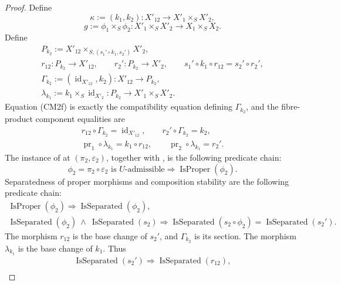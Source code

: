 \begin{proof}
  Define
  \[
    \kappa:=(k_1,k_2)\colon X'_{12}\to X'_1\times_SX'_2,
  \]
  \[
    g:=\phi_1\times_S\phi_2\colon
      X'_1\times_SX'_2\to X_1\times_SX_2.
  \]
  Define
  \[
  \begin{gathered}
    P_{k_2}:=X'_{12}\times_{S,(s_1'\circ k_1,s_2')}X'_2,\\
    r_{12}\colon P_{k_2}\to X'_{12},\qquad
    r_2'\colon P_{k_2}\to X'_2,\qquad
    s_1'\circ k_1\circ r_{12}=s_2'\circ r_2',\\
    \Gamma_{k_2}:=(\operatorname{id}_{X'_{12}},k_2)
      \colon X'_{12}\to P_{k_2},\\
    \lambda_{k_1}:=k_1\times_S\operatorname{id}_{X'_2}
      \colon P_{k_2}\to X'_1\times_SX'_2.                       
  \end{gathered} \tag{CM4a}
  \]
  Equation (CM2f) is exactly the compatibility equation defining
  $\Gamma_{k_2}$, and the fibre-product component equalities are
  \[
  \begin{gathered}
    r_{12}\circ\Gamma_{k_2}=\operatorname{id}_{X'_{12}},
    \qquad r_2'\circ\Gamma_{k_2}=k_2,\\
    \operatorname{pr}_1\circ\lambda_{k_1}=k_1\circ r_{12},
    \qquad \operatorname{pr}_2\circ\lambda_{k_1}=r_2'.          
  \end{gathered} \tag{CM4b}
  \]
  The instance of  at
  $(\pi_2,\varepsilon_2)$, together with
  , is the
  following predicate chain:
  \[
    \phi_2=\pi_2\circ\varepsilon_2
      \text{ is }U\text{-admissible}
      \Longrightarrow\operatorname{IsProper}(\phi_2).           \tag{CM4c0}
  \]
  Separatedness of proper morphisms and composition stability are the
  following predicate chain:
  \[
  \begin{gathered}
    \operatorname{IsProper}(\phi_2)
      \Longrightarrow\operatorname{IsSeparated}(\phi_2),\\
    \operatorname{IsSeparated}(\phi_2)\ \wedge\
      \operatorname{IsSeparated}(s_2)
      \Longrightarrow
      \operatorname{IsSeparated}(s_2\circ\phi_2)
      =\operatorname{IsSeparated}(s_2').                         
  \end{gathered} \tag{CM4c}
  \]
  The morphism $r_{12}$ is the base change of $s_2'$, and
  $\Gamma_{k_2}$ is its section.  The morphism $\lambda_{k_1}$ is the base
  change of $k_1$.  Thus
  \[
  \begin{gathered}
    \operatorname{IsSeparated}(s_2')
      \Longrightarrow\operatorname{IsSeparated}(r_{12}),\\

\end{gathered}\]
\end{proof}
